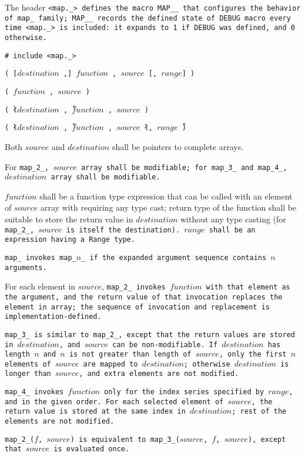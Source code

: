 The header \tt{<map._>} defines the macro \tt{MAP__} that configures
the behavior of \tt{map_} family; \tt{MAP__} records the \tt{defined}
state of \tt{DEBUG} macro every time \tt{<map._>} is included:
it expands to \tt{1} if \tt{DEBUG} was defined, and \tt{0} otherwise.


\tt{# include <map._>}

\s\s\s\tt{(} [$destination$ \tt{,}]
$function$ \tt{,} $source$ [\tt{,} $range$] \tt{)}

\s\tt{(} $function$ \tt{,} $source$ \tt{)}

\s\tt{(} \l$destination$ \tt{,}\r\
$function$ \tt{,} $source$ \tt{)}

\s\tt{(} \l$destination$ \tt{,}\r\
$function$ \tt{,} $source$ \l\tt{,} $range$\r\ \tt{)}


Both $source$ and $destination$ shall be pointers to complete arrays.

For \tt{map_2_}, $source$ array shall be modifiable;
for \tt{map_3_} and \tt{map_4_}, $destination$ array shall be modifiable.

$function$ shall be a function type expression that can be called with an
element of $source$ array with requiring any type cast; return type of the
function shall be suitable to store the return value in $destination$ without
any type casting (for \tt{map_2_}, $source$ is itself the destination).
$range$ shall be an expression having a \tt{Range} type.


\tt{map_} invokes \tt{map_}$n$\_ if the
expanded argument sequence contains $n$ arguments.

For each element in $source$, \tt{map_2_} invokes $function$ with that element
as the argument, and the return value of that invocation replaces the element
in array; the sequence of invocation and replacement is implementation-defined.

\tt{map_3_} is similar to \tt{map_2_}, except that the return values
are stored in $destination$, and $source$ can be non-modifiable.
If $destination$ has length $n$ and $n$ is not greater than length of $source$,
only the first $n$ elements of $source$ are mapped to $destination$; otherwise
$destination$ is longer than $source$, and extra elements are not modified.

\tt{map_4_} invokes $function$ only for the index
series specified by $range$, and in the given order.
For each selected element of $source$, the return value is stored at
the same index in $destination$; rest of the elements are not modified.

\note \tt{map_2_(}$f$\tt{,} $source$\tt{)} is equivalent
to \tt{map_3_(}$source$\tt{,} $f$\tt{,} $source$\tt{)},
except that $source$ is evaluated once.

